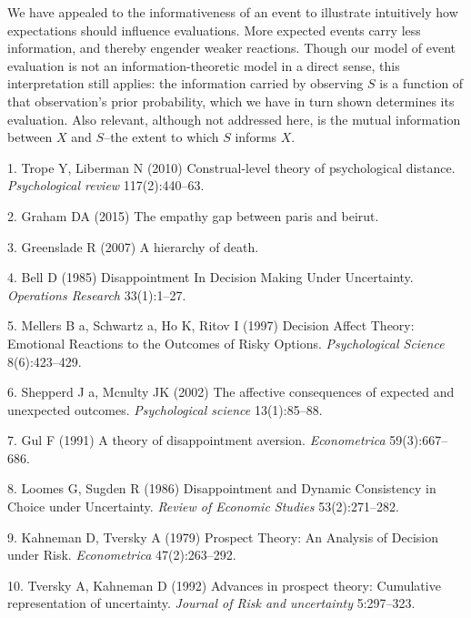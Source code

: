 \documentclass[9pt,twocolumn,twoside,lineno]{pnas-new}
\begin{document}
We have appealed to the informativeness of an event to illustrate
intuitively how expectations should influence evaluations. More expected
events carry less information, and thereby engender weaker reactions.
Though our model of event evaluation is not an information-theoretic
model in a direct sense, this interpretation still applies: the
information carried by observing \(S\) is a function of that
observation's prior probability, which we have in turn shown determines
its evaluation. Also relevant, although not addressed here, is the
mutual information between \(X\) and \(S\)--the extent to which \(S\)
informs \(X\).

\showmatmethods
\showacknow
\pnasbreak

\hypertarget{refs}{}
\hypertarget{ref-Trope2010}{}
1. Trope Y, Liberman N (2010) Construal-level theory of psychological
distance. \emph{Psychological review} 117(2):440--63.

\hypertarget{ref-Graham2015}{}
2. Graham DA (2015) The empathy gap between paris and beirut.

\hypertarget{ref-Greenslade2007}{}
3. Greenslade R (2007) A hierarchy of death.

\hypertarget{ref-Bell1985}{}
4. Bell D (1985) Disappointment In Decision Making Under Uncertainty.
\emph{Operations Research} 33(1):1--27.

\hypertarget{ref-Mellers1997}{}
5. Mellers B a, Schwartz a, Ho K, Ritov I (1997) Decision Affect Theory:
Emotional Reactions to the Outcomes of Risky Options.
\emph{Psychological Science} 8(6):423--429.

\hypertarget{ref-Shepperd2002}{}
6. Shepperd J a, Mcnulty JK (2002) The affective consequences of
expected and unexpected outcomes. \emph{Psychological science}
13(1):85--88.

\hypertarget{ref-Gul1991}{}
7. Gul F (1991) A theory of disappointment aversion. \emph{Econometrica}
59(3):667--686.

\hypertarget{ref-Loomes1986}{}
8. Loomes G, Sugden R (1986) Disappointment and Dynamic Consistency in
Choice under Uncertainty. \emph{Review of Economic Studies}
53(2):271--282.

\hypertarget{ref-Kahneman1979}{}
9. Kahneman D, Tversky A (1979) Prospect Theory: An Analysis of Decision
under Risk. \emph{Econometrica} 47(2):263--292.

\hypertarget{ref-Tversky1992}{}
10. Tversky A, Kahneman D (1992) Advances in prospect theory: Cumulative
representation of uncertainty. \emph{Journal of Risk and uncertainty}
5:297--323.
\end{document}

